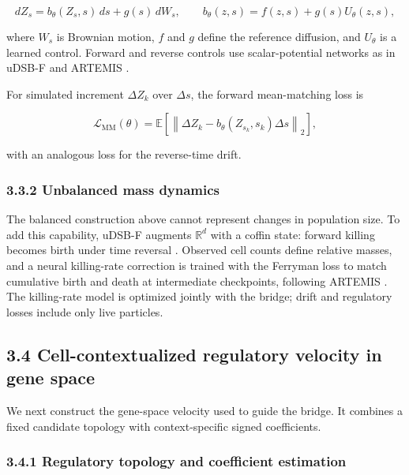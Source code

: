 \documentclass[
  11pt,
  letterpaper,
]{article}
\begin{document}
\[
dZ_s=b_\theta(Z_s,s)\,ds+g(s)\,dW_s,
\qquad
b_\theta(z,s)=f(z,s)+g(s)U_\theta(z,s),
\]

where \(W_s\) is Brownian motion, \(f\) and \(g\) define the reference
diffusion, and \(U_\theta\) is a learned control. Forward and reverse
controls use scalar-potential networks as in uDSB-F and ARTEMIS
\parencite{pariset_unbalanced_2023,alatkar_artemis_2025}.

For simulated increment \(\Delta Z_k\) over \(\Delta s\), the forward
mean-matching loss is

\[
\mathcal{L}_{\mathrm{MM}}(\theta)
=\mathbb{E}\!\left[
\left\lVert\Delta Z_k-b_\theta(Z_{s_k},s_k)\Delta s\right\rVert_2
\right],
\]

with an analogous loss for the reverse-time drift.

\subsubsection{3.3.2 Unbalanced mass
dynamics}\label{unbalanced-mass-dynamics}

The balanced construction above cannot represent changes in population
size. To add this capability, uDSB-F augments
\(\mathbb{R}^{d}\) with a coffin state: forward killing becomes birth
under time reversal \parencite{pariset_unbalanced_2023}. Observed cell counts define
relative masses, and a neural killing-rate correction is trained with
the Ferryman loss to match cumulative birth and death at intermediate
checkpoints, following ARTEMIS \parencite{alatkar_artemis_2025}. The killing-rate
model is optimized jointly with the bridge; drift and regulatory losses
include only live particles.

\subsection{3.4 Cell-contextualized regulatory velocity in gene
space}\label{cell-contextualized-regulatory-velocity-in-gene-space}

We next construct the gene-space velocity used to guide the bridge. It
combines a fixed candidate topology with context-specific signed
coefficients.

\subsubsection{3.4.1 Regulatory topology and coefficient
estimation}\label{regulatory-topology-and-coefficient-estimation}
\end{document}
